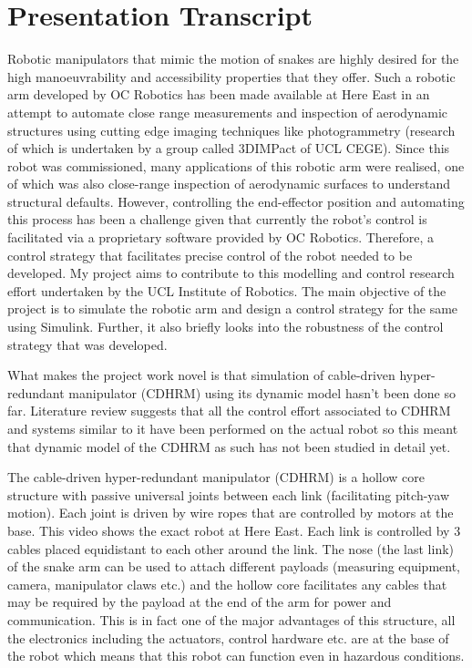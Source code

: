 \documentclass[a4paper,12pt]{article}
\begin{document}
\pagebreak

\section{Presentation Transcript}
Robotic manipulators that mimic the motion of snakes are highly desired for the high manoeuvrability and accessibility properties that they offer. Such a robotic arm developed by OC Robotics has been made available at Here East in an attempt to automate close range measurements and inspection of aerodynamic structures using cutting edge imaging techniques like photogrammetry (research of which is undertaken by a group called 3DIMPact of UCL CEGE). Since this robot was commissioned, many applications of this robotic arm were realised, one of which was also close-range inspection of aerodynamic surfaces to understand structural defaults. However, controlling the end-effector position and automating this process has been a challenge given that currently the robot’s control is facilitated via a proprietary software provided by OC Robotics. Therefore, a control strategy that facilitates precise control of the robot needed to be developed. My project aims to contribute to this modelling and control research effort undertaken by the UCL Institute of Robotics. The main objective of the project is to simulate the robotic arm and design a control strategy for the same using Simulink. Further, it also briefly looks into the robustness of the control strategy that was developed. 

What makes the project work novel is that simulation of cable-driven hyper-redundant manipulator (CDHRM) using its dynamic model hasn’t been done so far. Literature review suggests that all the control effort associated to CDHRM and systems similar to it have been performed on the actual robot so this meant that dynamic model of the CDHRM as such has not been studied in detail yet.

The cable-driven hyper-redundant manipulator (CDHRM) is a hollow core structure with passive universal joints between each link (facilitating pitch-yaw motion). Each joint is driven by wire ropes that are controlled by motors at the base. This video shows the exact robot at Here East. Each link is controlled by 3 cables placed equidistant to each other around the link. The nose (the last link) of the snake arm can be used to attach different payloads (measuring equipment, camera, manipulator claws etc.) and the hollow core facilitates any cables that may be required by the payload at the end of the arm for power and communication. This is in fact one of the major advantages of this structure, all the electronics including the actuators, control hardware etc. are at the base of the robot which means that this robot can function even in hazardous conditions.
\end{document}
